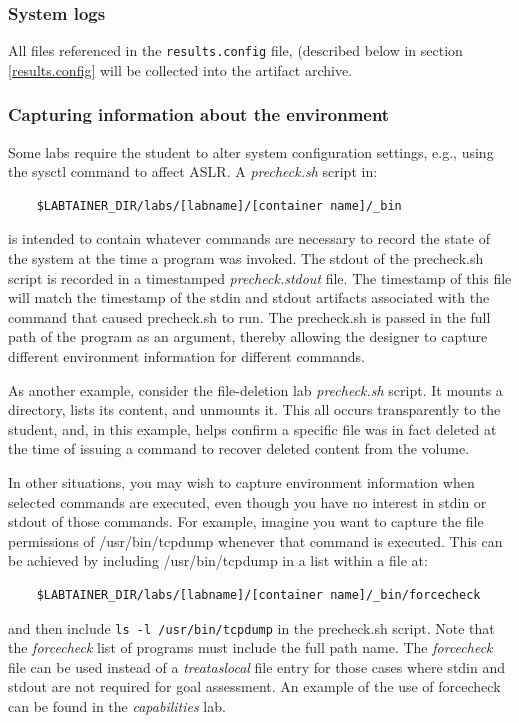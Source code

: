 \documentclass[12pt]{article}
\begin{document}
\subsubsection{System logs}
All files referenced in the {\tt results.config} file, (described below in section \ref{results.config}
will be collected into the artifact archive.  

\subsubsection{Capturing information about the environment}
\label{precheck}
Some labs require the student to alter system configuration settings,
e.g., using the sysctl command to affect ASLR. A \textit{precheck.sh} script in:
\begin{verbatim}
    $LABTAINER_DIR/labs/[labname]/[container name]/_bin
\end{verbatim}
is intended to contain whatever commands are necessary to record the 
state of the system at the time a program was invoked.  The stdout of
the precheck.sh script is recorded in a timestamped \textit{precheck.stdout}
file.  The timestamp of this file will match the timestamp of the stdin and
stdout artifacts associated with the command that caused precheck.sh to run.
The precheck.sh is passed in the full path of the program as an argument, thereby
allowing the designer to capture different environment information for different commands.

As another example, consider the file-deletion lab \textit{precheck.sh} script.
It mounts a directory, lists its content, and unmounts it.  This all occurs 
transparently to the student, and, in this example, helps confirm a specific file
was in fact deleted at the time of issuing a command to recover deleted content from
the volume.

In other situations, you may wish to capture environment information when selected
commands are executed, even though you have no interest in stdin or stdout of those
commands.  For example, imagine you want to capture the file permissions of /usr/bin/tcpdump
whenever that command is executed.  This can be achieved by including /usr/bin/tcpdump in a
list within a file at:
\begin{verbatim}
    $LABTAINER_DIR/labs/[labname]/[container name]/_bin/forcecheck
\end{verbatim}
\noindent and then include \texttt{ls -l /usr/bin/tcpdump} in the precheck.sh script.
Note that the \textit{forcecheck} list of programs must include the full path name.
The \textit{forcecheck} file can be used instead of a \textit{treataslocal} file entry
for those cases where stdin and stdout are not required for goal assessment.  An example of the use of
forcecheck can be found in the \textit{capabilities} lab.  
\end{document}
